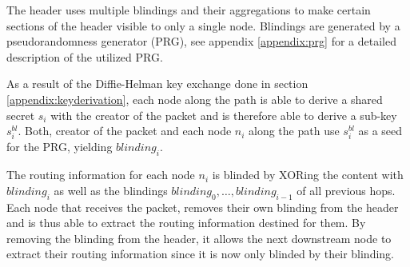 The header uses multiple blindings and their aggregations to make certain sections of the header visible to only a single node. Blindings are generated by a pseudorandomness generator (PRG), see appendix \ref{appendix:prg} for a detailed description of the utilized PRG.

As a result of the Diffie-Helman key exchange done in section \ref{appendix:keyderivation}, each node along the path is able to derive a shared secret $s_i$ with the creator of the packet and is therefore able to derive a sub-key $s_i^{bl}$. Both, creator of the packet and each node $n_i$ along the path use $s_i^{bl}$ as a seed for the PRG, yielding $blinding_i$.

The routing information for each node $n_i$ is blinded by XORing the content with $blinding_i$ as well as the blindings $blinding_0, \dots , blinding_{i-1}$ of all previous hops. Each node that receives the packet, removes their own blinding from the header and is thus able to extract the routing information destined for them. By removing the blinding from the header, it allows the next downstream node to extract their routing information since it is now only blinded by their blinding.

